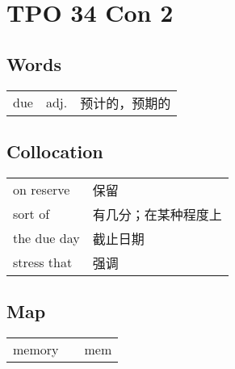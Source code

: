 \section{TPO 34 Con 2}

\subsection{Words}

\begin{tabular}{lll}
    due & adj. & 预计的，预期的 \\
\end{tabular}

\subsection{Collocation}

\begin{tabular}{ll}
    on reserve  & 保留         \\
    sort of     & 有几分；在某种程度上 \\
    the due day & 截止日期       \\
    stress that & 强调         \\
\end{tabular}

\subsection{Map}

\begin{tabular}{rc@{\quad$\to$\quad}l}
    memory &  & mem \\
\end{tabular}
